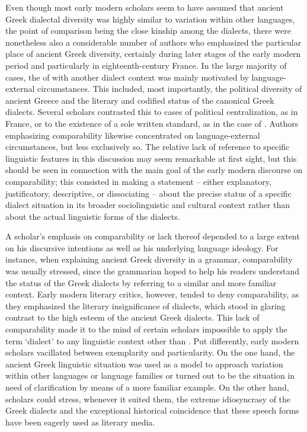 Even though most early modern scholars seem to have assumed that ancient Greek dialectal diversity was highly similar to variation within other languages, the point of comparison being the close kinship among the dialects, there were nonetheless also a considerable number of authors who emphasized the particular place of ancient Greek diversity, certainly during later stages of the early modern period and particularly in eighteenth-century France. In the large majority of cases, the  of  with another dialect context was mainly motivated by language-external circumstances. This included, most importantly, the political diversity of ancient Greece and the literary and codified status of the canonical Greek dialects. Several scholars contrasted this to cases of political centralization, as in France, or to the existence of a sole written standard, as in the case of . Authors emphasizing comparability likewise concentrated on language-external circumstances, but less exclusively so. The relative lack of reference to specific linguistic features in this discussion may seem remarkable at first sight, but this should be seen in connection with the main goal of the early modern discourse on comparability; this consisted in making a statement – either explanatory, justificatory, descriptive, or dissociating – about the precise status of a specific dialect situation in its broader sociolinguistic and cultural context rather than about the actual linguistic forms of the dialects.

A scholar’s emphasis on comparability or lack thereof depended to a large extent on his discursive intentions as well as his underlying language ideology. For instance, when explaining ancient Greek diversity in a grammar, comparability was usually stressed, since the grammarian hoped to help his readers understand the status of the Greek dialects by referring to a similar and more familiar context. Early modern literary critics, however, tended to deny comparability, as they emphasized the literary insignificance of  dialects, which stood in glaring contrast to the high esteem of the ancient Greek dialects. This lack of comparability made it to the mind of certain scholars impossible to apply the term ‘dialect’ to any linguistic context other than . Put differently, early modern scholars vacillated between exemplarity and particularity. On the one hand, the ancient Greek linguistic situation was used as a model to approach variation within other languages or language families or turned out to be the situation in need of clarification by means of a more familiar  example. On the other hand, scholars could stress, whenever it suited them, the extreme idiosyncrasy of the Greek dialects and the exceptional historical coincidence that these speech forms have been eagerly used as literary media.

